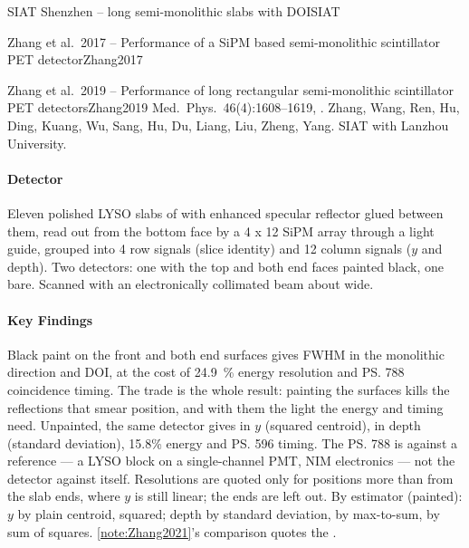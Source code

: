 \begin{programnote}{SIAT Shenzhen -- long semi-monolithic slabs with DOI}{SIAT}
\begin{papernote}{Zhang et al.\ 2017 -- Performance of a SiPM based semi-monolithic scintillator PET detector}{Zhang2017}
\end{papernote}

\begin{papernote}{Zhang et al.\ 2019 -- Performance of long rectangular semi-monolithic scintillator PET detectors}{Zhang2019}
Med.\ Phys.\ 46(4):1608--1619, . Zhang, Wang, Ren, Hu,
Ding, Kuang, Wu, Sang, Hu, Du, Liang, Liu, Zheng, Yang. SIAT with Lanzhou
University.

\paragraph{Detector}
Eleven polished LYSO slabs of  with enhanced
specular reflector glued between them, read out from the bottom face by a
4 x 12 SiPM array through a  light guide, grouped into 4 row signals
(slice identity) and 12 column signals ($y$ and depth). Two detectors: one
with the top and both end faces painted black, one bare. Scanned with an
electronically collimated  beam about  wide.

\paragraph{Key Findings}
Black paint on the front and both end surfaces gives  FWHM in the
monolithic direction and  DOI, at the cost of \qty{24.9}{\percent}
energy resolution and \ps{788} coincidence timing. The trade is the whole
result: painting the surfaces kills the reflections that smear position, and
with them the light the energy and timing need.
Unpainted, the same detector gives  in $y$ (squared centroid),
 in depth (standard deviation), 15.8\% energy and \ps{596}
timing. The \ps{788} is against a reference --- a  LYSO block on a single-channel PMT, NIM electronics --- not the
detector against itself. Resolutions are quoted only for positions more than
 from the slab ends, where $y$ is still linear; the ends are left out.
By estimator (painted): $y$  by plain centroid,  squared;
depth  by standard deviation,  by max-to-sum,  by
sum of squares. \ref{note:Zhang2021}'s comparison quotes the .


\end{papernote}
\end{programnote}
